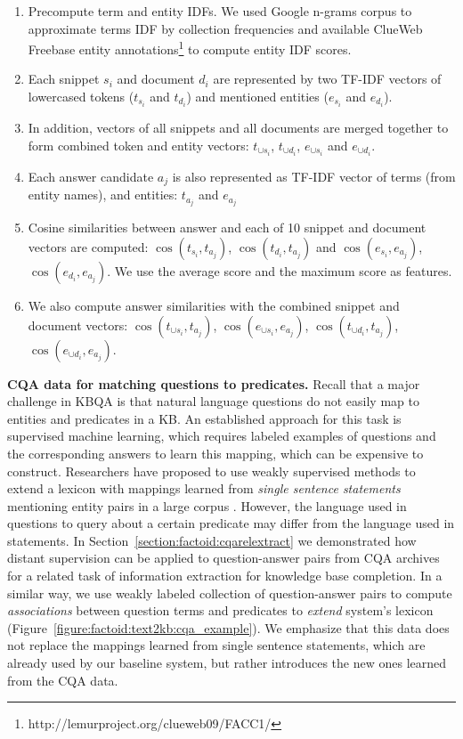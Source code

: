\begin{enumerate}
\item Precompute term and entity IDFs. We used Google n-grams corpus to approximate terms IDF by collection frequencies and available ClueWeb Freebase entity annotations\footnote{http://lemurproject.org/clueweb09/FACC1/} to compute entity IDF scores.
\item Each snippet $s_i$ and document $d_i$ are represented by two TF-IDF vectors of lowercased tokens ($t_{s_i}$ and $t_{d_i}$) and mentioned entities ($e_{s_i}$ and $e_{d_i}$).
\item In addition, vectors of all snippets and all documents are merged together to form combined token and entity vectors: $t_{\cup s_i}$, $t_{\cup d_i}$, $e_{\cup s_i}$ and $e_{\cup d_i}$.
\item Each answer candidate $a_j$ is also represented as TF-IDF vector of terms (from entity names), and entities: $t_{a_j}$ and $e_{a_j}$
\item Cosine similarities between answer and each of 10 snippet and document vectors are computed: $\cos(t_{s_i}, t_{a_j})$, $\cos(t_{d_i}, t_{a_j})$ and $\cos(e_{s_i}, e_{a_j})$, $\cos(e_{d_i}, e_{a_j})$.
We use the average score and the maximum score as features.
\item We also compute answer similarities with the combined snippet and document vectors: $\cos(t_{\cup s_i}, t_{a_j})$, $\cos(e_{\cup s_i}, e_{a_j})$, $\cos(t_{\cup d_i}, t_{a_j})$, $\cos(e_{\cup d_i}, e_{a_j})$.
\end{enumerate}

\textbf{CQA data for matching questions to predicates.}
Recall that a major challenge in KBQA is that natural language questions do not easily map to entities and predicates in a KB.
An established approach for this task is supervised machine learning, which requires labeled examples of questions and the corresponding answers to learn this mapping, which can be expensive to construct.
Researchers have proposed to use weakly supervised methods to extend a lexicon with mappings learned from \textit{single sentence statements} mentioning entity pairs in a large corpus \cite{YaoD14}.
However, the language used in questions to query about a certain predicate may differ from the language used in statements.
In Section~\ref{section:factoid:cqarelextract} we demonstrated how distant supervision can be applied to question-answer pairs from CQA archives for a related task of information extraction for knowledge base completion.
In a similar way, we use weakly labeled collection of question-answer pairs to compute {\em associations} between question terms and predicates to \textit{extend} system's lexicon (Figure~\ref{figure:factoid:text2kb:cqa_example}).
We emphasize that this data does not replace the mappings learned from single sentence statements, which are already used by our baseline system, but rather introduces the new ones learned from the CQA data.

